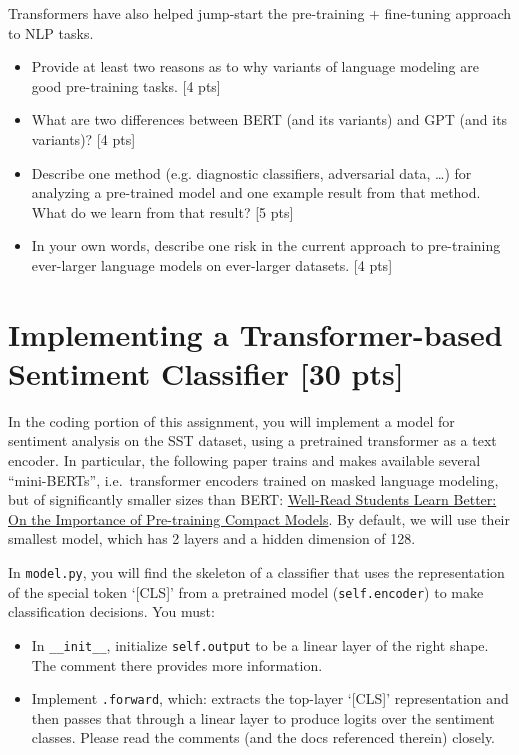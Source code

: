 \documentclass[11pt]{article}
\begin{document}
\vspace{2em}
 Transformers have also helped jump-start the pre-training + fine-tuning approach to NLP tasks.
\begin{itemize}
  \item Provide at least two reasons as to why variants of language modeling are good pre-training tasks. \hfill [4 pts]
  \item What are two differences between BERT (and its variants) and GPT (and its variants)? \hfill [4 pts]
  \item Describe one method (e.g. diagnostic classifiers, adversarial data, \dots) for analyzing a pre-trained model and one example result from that method.  What do we learn from that result? \hfill [5 pts]
  \item In your own words, describe one risk in the current approach to pre-training ever-larger language models on ever-larger datasets. \hfill [4 pts]
\end{itemize}


\section{Implementing a Transformer-based Sentiment Classifier [30 pts]}

In the coding portion of this assignment, you will implement a model for sentiment analysis on the SST dataset, using a pretrained transformer as a text encoder.  In particular, the following paper trains and makes available several ``mini-BERTs'', i.e.\ transformer encoders trained on masked language modeling, but of significantly smaller sizes than BERT: \href{https://arxiv.org/pdf/1908.08962.pdf}{Well-Read Students Learn Better: On the Importance of Pre-training Compact Models}.  By default, we will use their smallest model, which has 2 layers and a hidden dimension of 128.

\vspace{2em}
  In \texttt{model.py}, you will find the skeleton of a classifier that uses the representation of the special token `[CLS]' from a pretrained model (\texttt{self.encoder}) to make classification decisions.  You must:
\begin{itemize}
  \item In \texttt{\_\_init\_\_}, initialize \texttt{self.output} to be a linear layer of the right shape.  The comment there provides more information.
  \item Implement \texttt{.forward}, which: extracts the top-layer `[CLS]' representation and then passes that through a linear layer to produce logits over the sentiment classes.  Please read the comments (and the docs referenced therein) closely.
\end{itemize}
\end{document}
